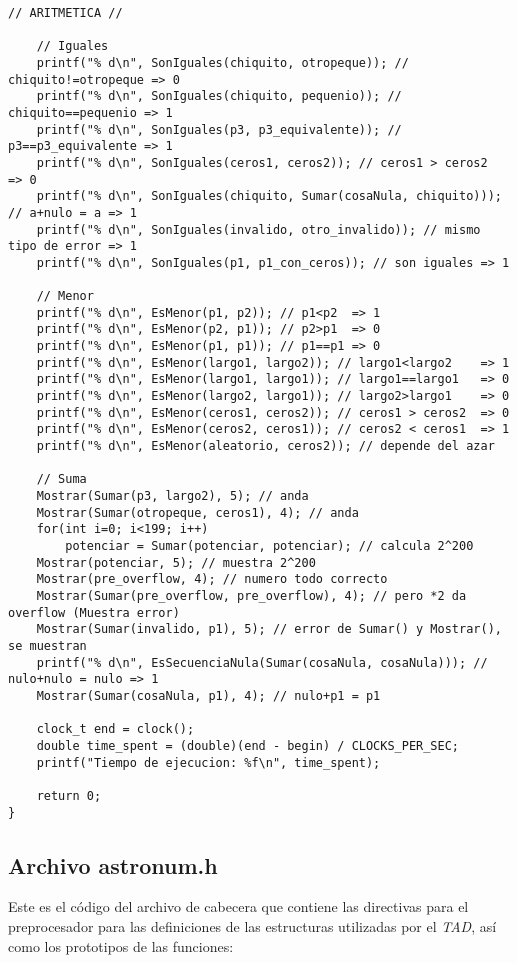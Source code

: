 \documentclass[a4paper, 12pt]{article}
\begin{document}
\begin{lstlisting}[style=C]
    // ARITMETICA //

    // Iguales
    printf("% d\n", SonIguales(chiquito, otropeque)); // chiquito!=otropeque => 0
    printf("% d\n", SonIguales(chiquito, pequenio)); // chiquito==pequenio => 1
    printf("% d\n", SonIguales(p3, p3_equivalente)); // p3==p3_equivalente => 1
    printf("% d\n", SonIguales(ceros1, ceros2)); // ceros1 > ceros2  => 0
    printf("% d\n", SonIguales(chiquito, Sumar(cosaNula, chiquito))); // a+nulo = a => 1
    printf("% d\n", SonIguales(invalido, otro_invalido)); // mismo tipo de error => 1
    printf("% d\n", SonIguales(p1, p1_con_ceros)); // son iguales => 1

    // Menor
    printf("% d\n", EsMenor(p1, p2)); // p1<p2  => 1
    printf("% d\n", EsMenor(p2, p1)); // p2>p1  => 0
    printf("% d\n", EsMenor(p1, p1)); // p1==p1 => 0
    printf("% d\n", EsMenor(largo1, largo2)); // largo1<largo2    => 1
    printf("% d\n", EsMenor(largo1, largo1)); // largo1==largo1   => 0
    printf("% d\n", EsMenor(largo2, largo1)); // largo2>largo1    => 0
    printf("% d\n", EsMenor(ceros1, ceros2)); // ceros1 > ceros2  => 0
    printf("% d\n", EsMenor(ceros2, ceros1)); // ceros2 < ceros1  => 1
    printf("% d\n", EsMenor(aleatorio, ceros2)); // depende del azar

    // Suma
    Mostrar(Sumar(p3, largo2), 5); // anda
    Mostrar(Sumar(otropeque, ceros1), 4); // anda
    for(int i=0; i<199; i++)
        potenciar = Sumar(potenciar, potenciar); // calcula 2^200
    Mostrar(potenciar, 5); // muestra 2^200
    Mostrar(pre_overflow, 4); // numero todo correcto
    Mostrar(Sumar(pre_overflow, pre_overflow), 4); // pero *2 da overflow (Muestra error)
    Mostrar(Sumar(invalido, p1), 5); // error de Sumar() y Mostrar(), se muestran
    printf("% d\n", EsSecuenciaNula(Sumar(cosaNula, cosaNula))); // nulo+nulo = nulo => 1
    Mostrar(Sumar(cosaNula, p1), 4); // nulo+p1 = p1

    clock_t end = clock();
    double time_spent = (double)(end - begin) / CLOCKS_PER_SEC;
    printf("Tiempo de ejecucion: %f\n", time_spent);

    return 0;
}
\end{lstlisting}

\subsection{Archivo astronum.h} \label{header-astronum}

Este es el código del archivo de cabecera que contiene las directivas para el preprocesador para las definiciones de las estructuras utilizadas por el \emph{TAD}, así como los prototipos de las funciones:
\end{document}
